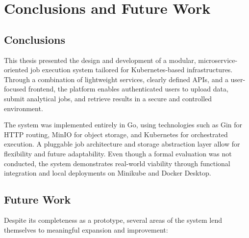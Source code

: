 \chapter{Conclusions and Future Work}
\label{Chapter-Conclusions}

\section{Conclusions}

This thesis presented the design and development of a modular, microservice-oriented job execution system tailored for Kubernetes-based infrastructures. Through a combination of lightweight services, clearly defined APIs, and a user-focused frontend, the platform enables authenticated users to upload data, submit analytical jobs, and retrieve results in a secure and controlled environment.

The system was implemented entirely in Go, using technologies such as Gin for HTTP routing, MinIO for object storage, and Kubernetes for orchestrated execution. A pluggable job architecture and storage abstraction layer allow for flexibility and future adaptability. Even though a formal evaluation was not conducted, the system demonstrates real-world viability through functional integration and local deployments on Minikube and Docker Desktop.

\section{Future Work}

Despite its completeness as a prototype, several areas of the system lend themselves to meaningful expansion and improvement:

